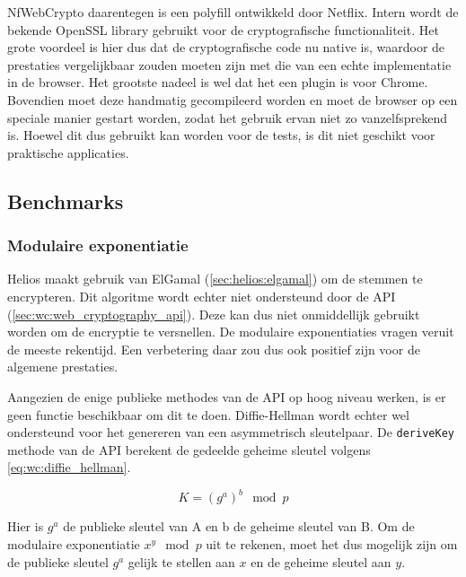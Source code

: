 \npar NfWebCrypto daarentegen is een \cplusplus polyfill ontwikkeld door Netflix.\cite{site:nfwebcrypto} Intern wordt de bekende OpenSSL library gebruikt voor de cryptografische functionaliteit. Het grote voordeel is hier dus dat de cryptografische code nu native is, waardoor de prestaties vergelijkbaar zouden moeten zijn met die van een echte implementatie in de browser. Het grootste nadeel is wel dat het een plugin is voor Chrome. Bovendien moet deze handmatig gecompileerd worden en moet de browser op een speciale manier gestart worden, zodat het gebruik ervan niet zo vanzelfsprekend is. Hoewel dit dus gebruikt kan worden voor de tests, is dit niet geschikt voor praktische applicaties.

\subsection{Benchmarks}
\label{sec:wc:benchmarks}

\subsubsection{Modulaire exponentiatie}
\label{sec:wc:modulaire_exponentiatie}

Helios maakt gebruik van ElGamal (\ref{sec:helios:elgamal}) om de stemmen te encrypteren. Dit algoritme wordt echter niet ondersteund door de API (\ref{sec:wc:web_cryptography_api}). Deze kan dus niet onmiddellijk gebruikt worden om de encryptie te versnellen. De modulaire exponentiaties vragen veruit de meeste rekentijd. Een verbetering daar zou dus ook positief zijn voor de algemene prestaties.

\npar Aangezien de enige publieke methodes van de API op hoog niveau werken, is er geen functie beschikbaar om dit te doen. Diffie-Hellman wordt echter wel ondersteund voor het genereren van een asymmetrisch sleutelpaar. De \texttt{deriveKey} methode van de API berekent de gedeelde geheime sleutel volgens \ref{eq:wc:diffie_hellman}.\cite{diffie_hellman_new_directions_in_cryptography}

\begin{equation}
  \label{eq:wc:diffie_hellman}
  K = (g^a)^b \mod{p}
\end{equation}

\npar Hier is $g^a$ de publieke sleutel van A en b de geheime sleutel van B.  Om de modulaire exponentiatie $x^y \mod{p}$ uit te rekenen, moet het dus mogelijk zijn om de publieke sleutel $g^a$ gelijk te stellen aan $x$ en de geheime sleutel aan $y$.


